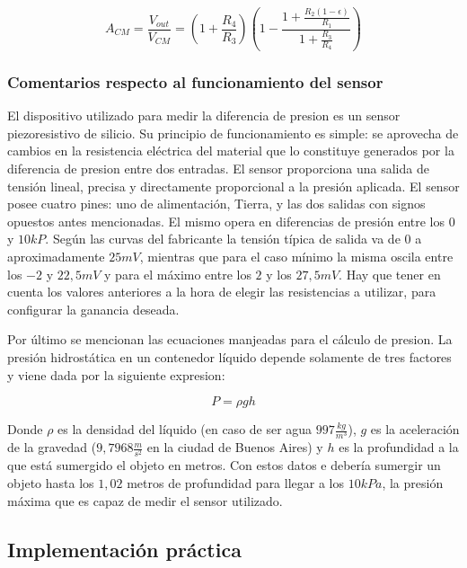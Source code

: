 \begin{equation}
A_{CM} = \frac{V_{out}}{V_{CM}} = (1 + \frac{R_4}{R_3})(1 - \frac{1 + \frac{R_2(1 - \epsilon)}{R_1}}{1 + \frac{R_3}{R_4}})
\end{equation}

\subsubsection{Comentarios respecto al funcionamiento del sensor}

El dispositivo utilizado para medir la diferencia de presion es un sensor piezoresistivo de silicio. Su principio de funcionamiento es simple: se aprovecha de cambios en la resistencia eléctrica del material que lo constituye generados por la diferencia de presion entre dos entradas. El sensor proporciona una salida de tensión lineal, precisa y directamente proporcional a la presión aplicada. El sensor posee cuatro pines: uno de alimentación, Tierra, y las dos salidas con signos opuestos antes mencionadas. El mismo opera en diferencias de presión entre los $0$ y $10kP$. Según las curvas del fabricante la tensión típica de salida va de $0$ a aproximadamente $25mV$, mientras que para el caso mínimo la misma oscila entre los $-2$ y $22,5mV$ y para el máximo entre los $2$ y los $27,5mV$. Hay que tener en cuenta los valores anteriores a la hora de elegir las resistencias a utilizar, para configurar la ganancia deseada. 

Por último se mencionan las ecuaciones manjeadas para el cálculo de presion. La presión hidrostática en un contenedor líquido depende solamente de tres factores y viene dada por la siguiente expresion:

\begin{equation}
P = \rho gh
\end{equation}

Donde $\rho$ es la densidad del líquido (en caso de ser agua $997\frac{kg}{m^3}$), $g$ es la aceleración de la gravedad ($9,7968\frac{m}{s^2}$ en la ciudad de Buenos Aires) y $h$ es la profundidad a la que está sumergido el objeto en metros. Con estos datos e debería sumergir un objeto hasta los $1,02$ metros de profundidad para llegar a los $10kPa$, la presión máxima que es capaz de medir el sensor utilizado. 


\subsection{Implementación práctica}

